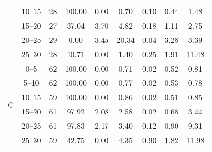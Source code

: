 \begin{table}[htbp]
{\begin{tabular}[t]{ccccccccc}
			                     & \SIrange{10}{15}{}              & 28                & 100.00            & 0.00                    & \SI{0.70}{}                       & \SI{0.10}{} & \SI{0.44}{} & \SI{1.48}{}  \\
			                     & \SIrange{15}{20}{}              & 27                & 37.04             & 3.70                    & \SI{4.82}{}                       & \SI{0.18}{} & \SI{1.11}{} & \SI{2.75}{}  \\
			                     & \SIrange{20}{25}{}              & 29                & 0.00              & 3.45                    & \SI{20.34}{}                      & \SI{0.04}{} & \SI{3.28}{} & \SI{3.39}{}  \\
			                     & \SIrange{25}{30}{}              & 28                & 10.71             & 0.00                    & \SI{1.40}{}                       & \SI{0.25}{} & \SI{1.91}{} & \SI{11.48}{} \\
			\hline
			\multirow{6}{*}{C}   & \SIrange{0}{5}{}                & 62                & 100.00            & 0.00                    & \SI{0.71}{}                       & \SI{0.02}{} & \SI{0.52}{} & \SI{0.81}{}  \\
			                     & \SIrange{5}{10}{}               & 62                & 100.00            & 0.00                    & \SI{0.77}{}                       & \SI{0.02}{} & \SI{0.53}{} & \SI{0.78}{}  \\
			                     & \SIrange{10}{15}{}              & 59                & 100.00            & 0.00                    & \SI{0.86}{}                       & \SI{0.02}{} & \SI{0.51}{} & \SI{0.85}{}  \\
			                     & \SIrange{15}{20}{}              & 61                & 97.92             & 2.08                    & \SI{2.58}{}                       & \SI{0.02}{} & \SI{0.68}{} & \SI{3.44}{}  \\
			                     & \SIrange{20}{25}{}              & 61                & 97.83             & 2.17                    & \SI{3.40}{}                       & \SI{0.12}{} & \SI{0.90}{} & \SI{9.31}{}  \\
			                     & \SIrange{25}{30}{}              & 59                & 42.75             & 0.00                    & \SI{4.35}{}                       & \SI{0.90}{} & \SI{1.82}{} & \SI{11.98}{} \\
			\bottomrule
		\end{tabular}
	}
\end{table}


